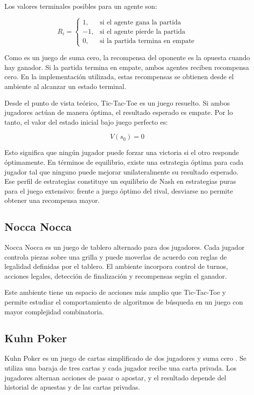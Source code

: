 \documentclass[letterpaper,12pt]{article}
\begin{document}
Los valores terminales posibles para un agente son:

\[
R_i =
\begin{cases}
1, & \text{si el agente gana la partida} \\
-1, & \text{si el agente pierde la partida} \\
0, & \text{si la partida termina en empate}
\end{cases}
\]

Como es un juego de suma cero, la recompensa del oponente es la opuesta cuando hay ganador. Si la partida termina en empate, ambos agentes reciben recompensa cero. En la implementación utilizada, estas recompensas se obtienen desde el ambiente al alcanzar un estado terminal.

Desde el punto de vista teórico, Tic-Tac-Toe es un juego resuelto. Si ambos jugadores actúan de manera óptima, el resultado esperado es empate. Por lo tanto, el valor del estado inicial bajo juego perfecto es:

\[
V(s_0) = 0
\]

Esto significa que ningún jugador puede forzar una victoria si el otro responde óptimamente. En términos de equilibrio, existe una estrategia óptima para cada jugador tal que ninguno puede mejorar unilateralmente su resultado esperado. Ese perfil de estrategias constituye un equilibrio de Nash en estrategias puras para el juego extensivo: frente a juego óptimo del rival, desviarse no permite obtener una recompensa mayor.

\subsection{Nocca Nocca}

Nocca Nocca es un juego de tablero alternado para dos jugadores. Cada jugador controla piezas sobre una grilla y puede moverlas de acuerdo con reglas de legalidad definidas por el tablero. El ambiente incorpora control de turnos, acciones legales, detección de finalización y recompensas según el ganador.

Este ambiente tiene un espacio de acciones más amplio que Tic-Tac-Toe y permite estudiar el comportamiento de algoritmos de búsqueda en un juego con mayor complejidad combinatoria.

\subsection{Kuhn Poker}

Kuhn Poker es un juego de cartas simplificado de dos jugadores y suma cero \citep{kuhn1950}. Se utiliza una baraja de tres cartas y cada jugador recibe una carta privada. Los jugadores alternan acciones de pasar o apostar, y el resultado depende del historial de apuestas y de las cartas privadas.
\end{document}
